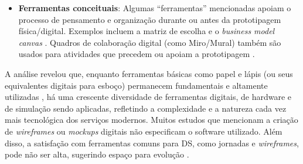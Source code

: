\begin{itemize}
	\item \textbf{Ferramentas conceituais}: Algumas ``ferramentas'' mencionadas apoiam o processo de pensamento e organização durante ou antes da prototipagem física/digital. Exemplos incluem a matriz de escolha \cite{soto2023prototyping} e o \textit{business model canvas} \cite{you2022applying, paust2025integrative}. Quadros de colaboração digital (como Miro/Mural) também são usados para atividades que precedem ou apoiam a prototipagem \cite{quintero2021interdisciplinary, iriarte2023service}.
	
\end{itemize}

A análise revelou que, enquanto ferramentas básicas como papel e lápis (ou seus equivalentes digitais para esboço) permanecem fundamentais e altamente utilizadas \cite{wang2023smartproducts}, há uma crescente diversidade de ferramentas digitais, de hardware e de simulação sendo aplicadas, refletindo a complexidade e a natureza cada vez mais tecnológica dos serviços modernos. Muitos estudos que mencionam a criação de \textit{wireframes} ou \textit{mockups} digitais não especificam o software utilizado. Além disso, a satisfação com ferramentas comuns para DS, como jornadas e \textit{wireframes}, pode não ser alta, sugerindo espaço para evolução \cite{wang2023smartproducts}.






 
